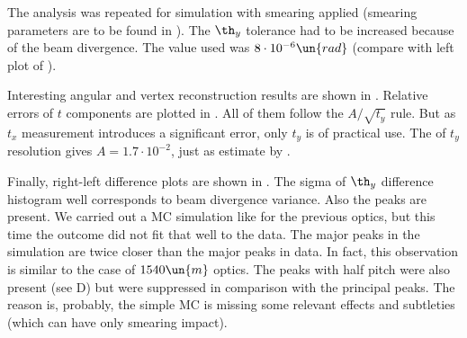 




The analysis was repeated for simulation with smearing applied (smearing parameters are to be found in ). The $\th_y$ tolerance had to be increased because of the beam divergence. The value used was $8\cdot10^{-6}\un{rad}$ (compare with left plot of ).

Interesting angular and vertex reconstruction results are shown in . Relative errors of $t$ components are plotted in . All of them follow the $A/\sqrt{t_y}$ rule. But as $t_x$ measurement introduces a significant error, only $t_y$ is of practical use. The of $t_y$ resolution gives $A = 1.7\cdot10^{-2}$, just as estimate by .

\hbox{}
\kern-2.0cm
\kern-0.5cm
\emfig
\kern-0.5cm

Finally, right-left difference plots are shown in . The sigma of $\th_y$ difference histogram well corresponds to beam divergence variance. Also the peaks are present. We carried out a MC simulation like for the previous optics, but this time the outcome did not fit that well to the data. The major peaks in the simulation are twice closer than the major peaks in data. In fact, this observation is similar to the case of $1540\un{m}$ optics. The peaks with half pitch were also present (see D) but were suppressed in comparison with the principal peaks. The reason is, probably, the simple MC is missing some relevant effects and subtleties (which can have only smearing impact). 

